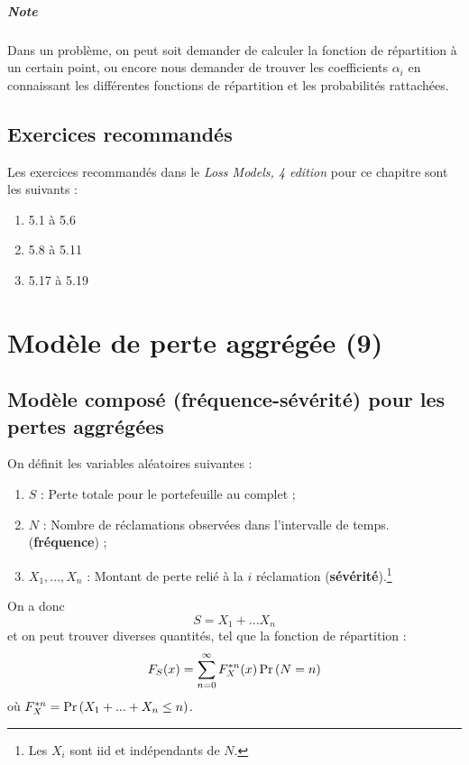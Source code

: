 \documentclass[12pt, french]{report}
\begin{document}
\paragraph{Note} Dans un problème, on peut soit demander de calculer la fonction de répartition à un certain point, ou encore nous demander de trouver les coefficients $\alpha_i$ en connaissant les différentes fonctions de répartition et les probabilités rattachées.


\section{Exercices recommandés}
Les exercices recommandés dans le \emph{Loss Models, 4 edition} pour ce chapitre sont les suivants : 
\begin{enumerate}[label=\faAngleRight]
\item 5.1 à 5.6
\item 5.8 à 5.11
\item 5.17 à 5.19
\end{enumerate}



\chapter{Modèle de perte aggrégée (9)}

\section{Modèle composé (fréquence-sévérité) pour les pertes aggrégées}
On définit les variables aléatoires suivantes : 
\begin{enumerate}[label=\faAngleRight]
\item $S$ : Perte totale pour le portefeuille au complet ;
\item $N$ : Nombre de réclamations observées dans l'intervalle de temps. (\textbf{fréquence}) ;
\item $X_1, ..., X_n$ : Montant de perte relié à la $i$ réclamation (\textbf{sévérité}).\footnote{Les $X_i$ sont iid et indépendants de $N$.}
\end{enumerate}
On a donc
\[ S = X_1 + ... X_n  \]
et on peut trouver diverses quantités, tel que la fonction de répartition : 
\begin{equation}
F_S(x) = \sum_{n=0}^{\infty} F_X^{*n}(x) \Pr \left( N = n \right)
\end{equation}
où $F_X^{*n} = \Pr \left( X_1 + ... + X_n \leq n \right)$. \\
\end{document}
